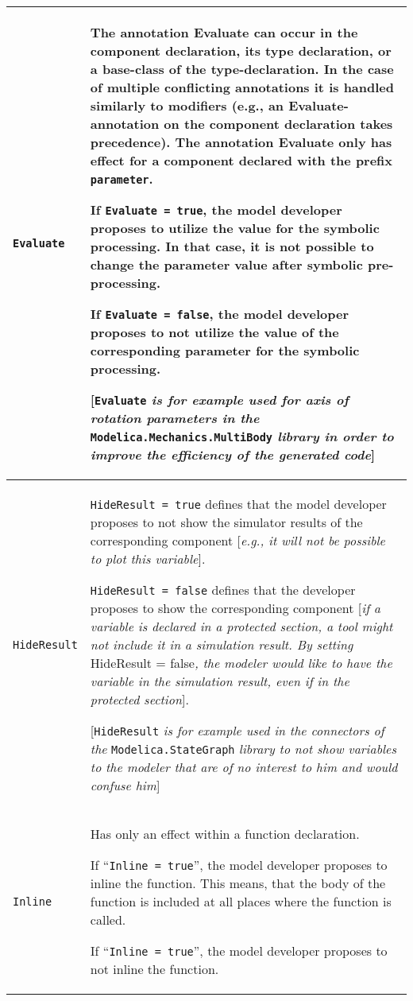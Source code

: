 \begin{longtable}[]{|p{4.2cm}|p{10cm}|}
\hline \endhead
\lstinline!Evaluate!&
The annotation Evaluate can occur in the component declaration, its type
declaration, or a base-class of the type-declaration. In the case of
multiple conflicting annotations it is handled similarly to modifiers
(e.g., an Evaluate-annotation on the component declaration takes
precedence). The annotation Evaluate only has effect for a component
declared with the prefix \lstinline!parameter!.

If \lstinline!Evaluate = true!, the model developer proposes to utilize the value
for the symbolic processing. In that case, it is not possible to change
the parameter value after symbolic pre-processing.

If \lstinline!Evaluate = false!, the model developer proposes to not utilize the
value of the corresponding parameter for the symbolic processing.

{[}\lstinline!Evaluate! \emph{is for example used for axis of rotation parameters in
the} \lstinline!Modelica.Mechanics.MultiBody! \emph{library in order to improve the
efficiency of the generated code}{]}\\ \hline
\lstinline!HideResult! &
\lstinline!HideResult = true! defines that the model developer proposes to not show
the simulator results of the corresponding component {[}\emph{e.g., it
will not be possible to plot this variable}{]}.

\lstinline!HideResult = false! defines that the developer proposes to show the
corresponding component {[}\emph{if a variable is declared in a
protected section, a tool might not include it in a simulation result.
By setting} HideResult = false\emph{, the modeler would like to have the
variable in the simulation result, even if in the protected section}{]}.

{[}\lstinline!HideResult! \emph{is for example used in the connectors of the}
\lstinline!Modelica.StateGraph! \emph{library to not show variables to the modeler
that are of no interest to him and would confuse him}{]}\\ \hline
\lstinline!Inline! &
Has only an effect within a function declaration.

If ``\lstinline!Inline = true!'', the model developer proposes to inline the
function. This means, that the body of the function is included at all
places where the function is called.

If ``\lstinline!Inline = true!'', the model developer proposes to not inline the
function.


\end{longtable}
